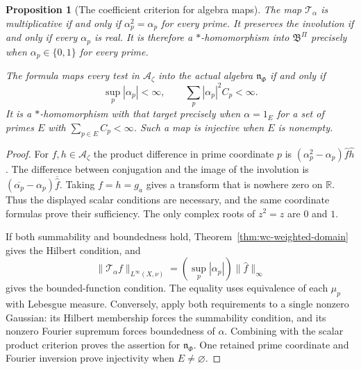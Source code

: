 \documentclass[11pt]{article}
\newtheorem{proposition}[theorem]{Proposition}
\theoremstyle{definition}
\theoremstyle{remark}
\numberwithin{equation}{section}
\newcommand{\cA}{\mathcal A}
\newcommand{\R}{\mathbb R}
\begin{document}
\begin{proposition}[The coefficient criterion for algebra maps]
\label{prop:wc-weighted-algebra}
The map $\mathcal T_\alpha$ is multiplicative if and only if
$\alpha_p^2=\alpha_p$ for every prime.
It preserves the involution if and only if every $\alpha_p$ is real.
It is therefore a $*$-homomorphism into $\mathfrak B^\Pi$ precisely when
$\alpha_p\in\{0,1\}$ for every prime.

The formula maps every test in $\cA_\zeta$ into the actual algebra
$\mathfrak n_\Phi$ if and only if
\[
 \sup_p|\alpha_p|<\infty,
 \qquad \sum_p|\alpha_p|^2C_p<\infty.
\]
It is a $*$-homomorphism with that target precisely when
$\alpha=1_E$ for a set of primes $E$ with
$\sum_{p\in E}C_p<\infty$.
Such a map is injective when $E$ is nonempty.
\end{proposition}
\begin{proof}
For $f,h\in\cA_\zeta$ the product difference in prime coordinate $p$ is
$(\alpha_p^2-\alpha_p)\widehat f\widehat h$.
The difference between conjugation and the image of the involution is
$(\overline{\alpha_p}-\alpha_p)\overline{\widehat f}$.
Taking $f=h=g_a$ gives a transform that is nowhere zero on $\R$.
Thus the displayed scalar conditions are necessary, and the same
coordinate formulas prove their sufficiency.
The only complex roots of $z^2=z$ are $0$ and $1$.

If both summability and boundedness hold, Theorem~\ref{thm:wc-weighted-domain}
gives the Hilbert condition, and
\[
 \|\mathcal T_\alpha f\|_{L^\infty(X,\nu)}
 =\left(\sup_p|\alpha_p|\right)\|\widehat f\|_\infty
\]
gives the bounded-function condition.
The equality uses equivalence of each $\mu_p$ with Lebesgue measure.
Conversely, apply both requirements to a single nonzero Gaussian:
its Hilbert membership forces the summability condition, and its nonzero
Fourier supremum forces boundedness of $\alpha$.
Combining with the scalar product criterion proves the assertion for
$\mathfrak n_\Phi$.  One retained prime coordinate and Fourier inversion
prove injectivity when $E\ne\varnothing$.
\end{proof}
\end{document}
